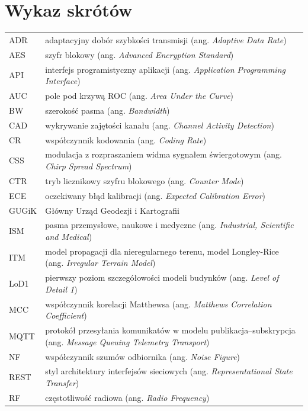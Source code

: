 \chapter*{Wykaz skrótów}

\begin{longtable}{@{}p{1.8cm}p{13.2cm}@{}}
ADR & adaptacyjny dobór szybkości transmisji (ang. \textit{Adaptive Data Rate}) \\
AES & szyfr blokowy (ang. \textit{Advanced Encryption Standard}) \\
API & interfejs programistyczny aplikacji (ang. \textit{Application Programming Interface}) \\
AUC & pole pod krzywą ROC (ang. \textit{Area Under the Curve}) \\
BW & szerokość pasma (ang. \textit{Bandwidth}) \\
CAD & wykrywanie zajętości kanału (ang. \textit{Channel Activity Detection}) \\
CR & współczynnik kodowania (ang. \textit{Coding Rate}) \\
CSS & modulacja z rozpraszaniem widma sygnałem świergotowym (ang. \textit{Chirp Spread Spectrum}) \\
CTR & tryb licznikowy szyfru blokowego (ang. \textit{Counter Mode}) \\
ECE & oczekiwany błąd kalibracji (ang. \textit{Expected Calibration Error}) \\
GUGiK & Główny Urząd Geodezji i Kartografii \\
ISM & pasma przemysłowe, naukowe i medyczne (ang. \textit{Industrial, Scientific and Medical}) \\
ITM & model propagacji dla nieregularnego terenu, model Longley-Rice (ang. \textit{Irregular Terrain Model}) \\
LoD1 & pierwszy poziom szczegółowości modeli budynków (ang. \textit{Level of Detail 1}) \\
MCC & współczynnik korelacji Matthewsa (ang. \textit{Matthews Correlation Coefficient}) \\
MQTT & protokół przesyłania komunikatów w modelu publikacja--subskrypcja (ang. \textit{Message Queuing Telemetry Transport}) \\
NF & współczynnik szumów odbiornika (ang. \textit{Noise Figure}) \\
REST & styl architektury interfejsów sieciowych (ang. \textit{Representational State Transfer}) \\
RF & częstotliwość radiowa (ang. \textit{Radio Frequency}) \\

\end{longtable}
